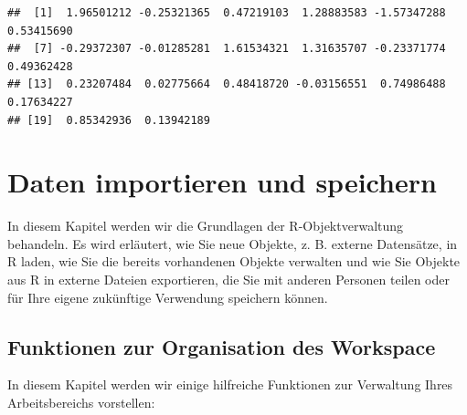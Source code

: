 \documentclass[
]{book}
\begin{document}
\begin{verbatim}
##  [1]  1.96501212 -0.25321365  0.47219103  1.28883583 -1.57347288  0.53415690
##  [7] -0.29372307 -0.01285281  1.61534321  1.31635707 -0.23371774  0.49362428
## [13]  0.23207484  0.02775664  0.48418720 -0.03156551  0.74986488  0.17634227
## [19]  0.85342936  0.13942189
\end{verbatim}

\hypertarget{daten-importieren-und-speichern}{%
\chapter{Daten importieren und speichern}\label{daten-importieren-und-speichern}}

In diesem Kapitel werden wir die Grundlagen der R-Objektverwaltung behandeln. Es wird erläutert, wie Sie neue Objekte, z. B. externe Datensätze, in R laden, wie Sie die bereits vorhandenen Objekte verwalten und wie Sie Objekte aus R in externe Dateien exportieren, die Sie mit anderen Personen teilen oder für Ihre eigene zukünftige Verwendung speichern können.

\hypertarget{funktionen-zur-organisation-des-workspace}{%
\section{Funktionen zur Organisation des Workspace}\label{funktionen-zur-organisation-des-workspace}}

In diesem Kapitel werden wir einige hilfreiche Funktionen zur Verwaltung Ihres Arbeitsbereichs vorstellen:
\end{document}
